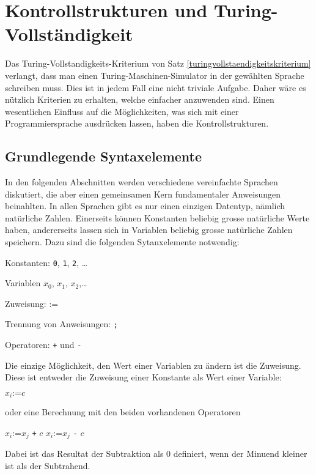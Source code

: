 %
%
%
\section{Kontrollstrukturen und Turing-Vollständigkeit}
Das Turing-Vollstandigkeits-Kriterium von Satz
\ref{turingvollstaendigkeitskriterium} verlangt, dass man einen
Turing-Maschinen-Simulator in der gewählten Sprache schreiben muss.
Dies ist in jedem Fall eine nicht triviale Aufgabe.
Daher wäre es nützlich Kriterien zu erhalten, welche einfacher
anzuwenden sind. Einen wesentlichen Einfluss auf die Möglichkeiten,
was sich mit einer Programmiersprache ausdrücken lassen, haben die
Kontrollstrukturen.

\newcommand{\assignment}{\mathbin{\texttt{:=}}}

\subsection{Grundlegende Syntaxelemente%
\label{subsection:grundlegende-syntaxelement}}
In den folgenden Abschnitten werden verschiedene vereinfachte Sprachen
diskutiert, die aber einen gemeinsamen Kern fundamentaler Anweisungen
beinahlten.
In allen Sprachen gibt es nur einen einzigen Datentyp, nämlich
natürliche Zahlen.
Einerseits können Konstanten beliebig grosse natürliche Werte haben,
andererseits lassen sich in Variablen beliebig grosse natürliche Zahlen
speichern.
Dazu sind die folgenden Sytanxelemente notwendig:
\begin{compactitem}
\item Konstanten: {\tt 0}, {\tt 1}, {\tt 2}, \dots
\item Variablen $x_0$, $x_1$, $x_2$,\dots
\item Zuweisung: $\assignment$
\item Trennung von Anweisungen: {\tt ;}
\item Operatoren: {\tt +} und {\tt -}
\end{compactitem}
Die einzige Möglichkeit, den Wert einer Variablen zu ändern ist die
Zuweisung.  Diese ist entweder die Zuweisung einer Konstante als
Wert einer Variable:
\begin{algorithmic}
\STATE $x_i\assignment c$
\end{algorithmic}
oder eine Berechnung mit den beiden vorhandenen Operatoren
\begin{algorithmic}
\STATE $x_i \assignment x_j$ {\tt +} $c$
\STATE $x_i \assignment x_j$ {\tt -} $c$
\end{algorithmic}
Dabei ist das Resultat der Subtraktion als $0$ definiert, wenn
der Minuend kleiner ist als der Subtrahend.

